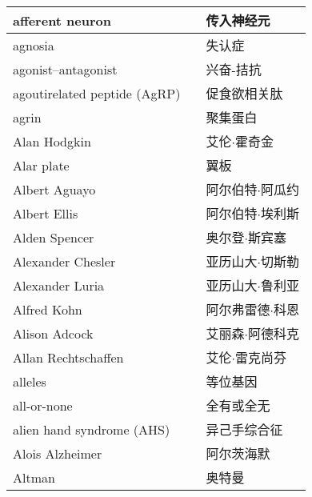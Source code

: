 \begin{longtable}{lll}
	\midrule
	afferent neuron     &&  传入神经元  \\
	
	\midrule
	agnosia     &&  失认症  \\
	
	\midrule
	agonist–antagonist     &&  兴奋-拮抗  \\
	
	\midrule
	agoutirelated peptide (AgRP)    &&  促食欲相关肽  \\
	
	\midrule
	agrin     &&  聚集蛋白  \\
	
	\midrule
	Alan Hodgkin    &&  艾伦$\cdot$霍奇金  \\
	
	\midrule
	Alar plate     &&  翼板  \\
	
	\midrule
	Albert Aguayo     &&  阿尔伯特$\cdot$阿瓜约  \\
	
	\midrule
	Albert Ellis     &&  阿尔伯特$\cdot$埃利斯  \\
	
	\midrule
	Alden Spencer     &&  奥尔登$\cdot$斯宾塞  \\
	
	\midrule
	Alexander Chesler     &&  亚历山大$\cdot$切斯勒  \\
	
	\midrule
	Alexander Luria     &&  亚历山大$\cdot$鲁利亚  \\
	
	\midrule
	Alfred Kohn     &&  阿尔弗雷德$\cdot$科恩  \\
	
	\midrule
	Alison Adcock     &&  艾丽森$\cdot$阿德科克  \\
	
	\midrule
	Allan Rechtschaffen     &&  艾伦$\cdot$雷克尚芬  \\
	
	\midrule
	alleles     &&  等位基因  \\
	
	\midrule
	all-or-none     &&  全有或全无  \\
	
	\midrule
	alien hand syndrome (AHS)     &&  异己手综合征  \\
	
	\midrule
	Alois Alzheimer     &&  阿尔茨海默  \\
	
	\midrule
	Altman     &&  奥特曼  \\
	

\end{longtable}

